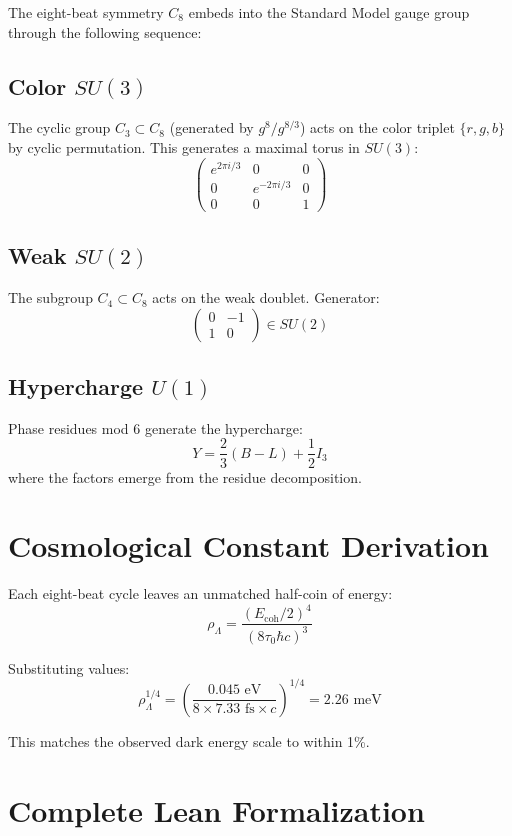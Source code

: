 \documentclass[12pt,a4paper]{article}
\begin{document}
The eight-beat symmetry $C_8$ embeds into the Standard Model gauge group through the following sequence:

\subsection{Color $SU(3)$}
The cyclic group $C_3 \subset C_8$ (generated by $g^8/g^{8/3}$) acts on the color triplet $\{r, g, b\}$ by cyclic permutation. This generates a maximal torus in $SU(3)$:
\[
\begin{pmatrix}
e^{2\pi i/3} & 0 & 0 \\
0 & e^{-2\pi i/3} & 0 \\
0 & 0 & 1
\end{pmatrix}
\]

\subsection{Weak $SU(2)$}
The subgroup $C_4 \subset C_8$ acts on the weak doublet. Generator:
\[
\begin{pmatrix}
0 & -1 \\
1 & 0
\end{pmatrix} \in SU(2)
\]

\subsection{Hypercharge $U(1)$}
Phase residues mod 6 generate the hypercharge:
\[
Y = \frac{2}{3}(B - L) + \frac{1}{2}I_3
\]
where the factors emerge from the residue decomposition.

\section{Cosmological Constant Derivation}

Each eight-beat cycle leaves an unmatched half-coin of energy:
\[
\rho_\Lambda = \frac{(E_{\text{coh}}/2)^4}{(8\tau_0 \hbar c)^3}
\]

Substituting values:
\[
\rho_\Lambda^{1/4} = \left(\frac{0.045 \text{ eV}}{8 \times 7.33 \text{ fs} \times c}\right)^{1/4} = 2.26 \text{ meV}
\]

This matches the observed dark energy scale to within 1\%.

\section{Complete Lean Formalization}
\end{document}
